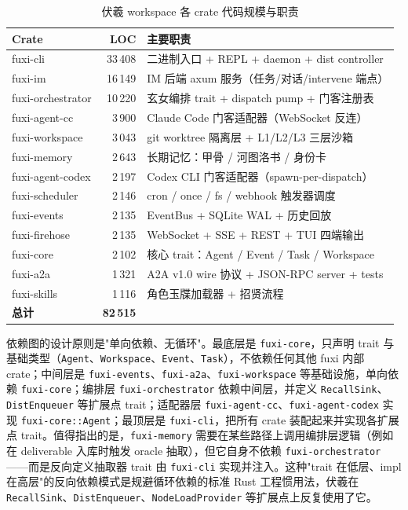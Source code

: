 \begin{table}[H]
\centering
\caption{伏羲 workspace 各 crate 代码规模与职责}
\label{tab:crate-layout}
\begin{tabular}{lrl}
\toprule
\textbf{Crate} & \textbf{LOC} & \textbf{主要职责} \\
\midrule
fuxi-cli & 33\,408 & 二进制入口 + REPL + daemon + dist controller \\
fuxi-im & 16\,149 & IM 后端 axum 服务（任务/对话/intervene 端点） \\
fuxi-orchestrator & 10\,220 & 玄女编排 trait + dispatch pump + 门客注册表 \\
fuxi-agent-cc & 3\,900 & Claude Code 门客适配器（WebSocket 反连） \\
fuxi-workspace & 3\,043 & git worktree 隔离层 + L1/L2/L3 三层沙箱 \\
fuxi-memory & 2\,643 & 长期记忆：甲骨 / 河图洛书 / 身份卡 \\
fuxi-agent-codex & 2\,197 & Codex CLI 门客适配器（spawn-per-dispatch） \\
fuxi-scheduler & 2\,146 & cron / once / fs / webhook 触发器调度 \\
fuxi-events & 2\,135 & EventBus + SQLite WAL + 历史回放 \\
fuxi-firehose & 2\,135 & WebSocket + SSE + REST + TUI 四端输出 \\
fuxi-core & 2\,102 & 核心 trait：Agent / Event / Task / Workspace \\
fuxi-a2a & 1\,321 & A2A v1.0 wire 协议 + JSON-RPC server + tests \\
fuxi-skills & 1\,116 & 角色玉牒加载器 + 招贤流程 \\
\midrule
\textbf{总计} & \textbf{82\,515} & \\
\bottomrule
\end{tabular}
\end{table}

依赖图的设计原则是"单向依赖、无循环"。最底层是 \texttt{fuxi-core}，只声明 trait 与基础类型（\texttt{Agent}、\texttt{Workspace}、\texttt{Event}、\texttt{Task}），不依赖任何其他 fuxi 内部 crate；中间层是 \texttt{fuxi-events}、\texttt{fuxi-a2a}、\texttt{fuxi-workspace} 等基础设施，单向依赖 \texttt{fuxi-core}；编排层 \texttt{fuxi-orchestrator} 依赖中间层，并定义 \texttt{RecallSink}、\texttt{DistEnqueuer} 等扩展点 trait；适配器层 \texttt{fuxi-agent-cc}、\texttt{fuxi-agent-codex} 实现 \texttt{fuxi-core::Agent}；最顶层是 \texttt{fuxi-cli}，把所有 crate 装配起来并实现各扩展点 trait。值得指出的是，\texttt{fuxi-memory} 需要在某些路径上调用编排层逻辑（例如在 deliverable 入库时触发 oracle 抽取），但它自身不依赖 \texttt{fuxi-orchestrator}——而是反向定义抽取器 trait 由 \texttt{fuxi-cli} 实现并注入。这种"trait 在低层、impl 在高层"的反向依赖模式是规避循环依赖的标准 Rust 工程惯用法，伏羲在 \texttt{RecallSink}、\texttt{DistEnqueuer}、\texttt{NodeLoadProvider} 等扩展点上反复使用了它。

